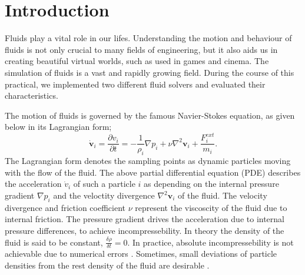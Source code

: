 \documentclass[11pt, letterpaper, twocolumn]{article}
\begin{document}


\section{Introduction} \label{sec:introduction}

Fluids play a vital role in our lifes. Understanding the motion and behaviour of fluids is not only crucial to many fields of engineering, but it also aids us in creating beautiful virtual worlds, such as used in games and cinema. The simulation of fluids is a vast and rapidly growing field. During the course of this practical, we implemented two different fluid solvers and evaluated their characteristics.

The motion of fluids is governed by the famous Navier-Stokes equation, as given below in its Lagrangian form;
\begin{equation}
  \mathbf{\dot{v}}_i = \frac{\partial v_i}{\partial t} = -\frac{1}{\rho_i}\nabla p_i +\nu \nabla^2 \mathbf{v}_i + \frac{F^{ext}_i}{m_i}.
\end{equation}
The Lagrangian form denotes the sampling points as dynamic particles moving with the flow of the fluid. The above partial differential equation (PDE) describes the acceleration \( \dot{v}_i\) of such a particle \( i \) as depending on the internal pressure gradient \( \nabla p_i\) and the veloctity divergence \( \nabla^2 \mathbf{v}_i\) of the fluid. The velocity divergence and friction coefficient \( \nu \) represent the viscoscity of the fluid due to internal friction. The pressure gradient drives the acceleration due to internal pressure differences, to achieve incompressebility. In theory the density of the fluid is said to be constant, 
\(\frac{\delta \rho}{\delta t} = 0\).
In practice, absolute incompressebility is not achievable due to numerical errors \cite{bender2015}. Sometimes, small deviations of particle densities from the rest density of the fluid are desirable \cite{ihmsen2014}. 
\end{document}
